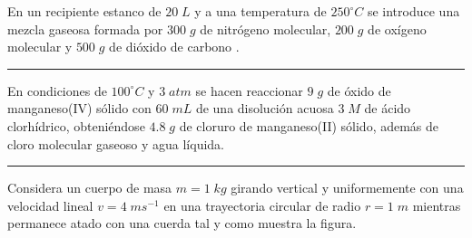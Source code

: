 \documentclass[a4paper,addpoints, 12pt]{exam}
\newcommand{\halmos}{\vspace*{-6mm}
	
					\begin{flushright}
						\rule{1mm}{2.5mm} 
					\end{flushright}
					\vspace*{-4mm}
						
					  }
\renewcommand{\qed}{\halmos}
\begin{document}
\begin{questions}

\question En un recipiente estanco de $20\;L$ y a una temperatura de $250^\circ C$ se introduce una mezcla gaseosa formada por $300\;g$ de nitrógeno molecular, $200\;g$ de oxígeno molecular y $500\;g$ de dióxido de carbono .
		\qed

\question En condiciones de $100^\circ C$ y $3\;atm$  se hacen reaccionar $9\;g$ de óxido de manganeso{\small(IV)} sólido con $60\;mL$ de una disolución acuosa $3\;M$ de ácido clorhídrico, obteniéndose $4.8\;g$ de cloruro de manganeso{\small(II)} sólido,  además de cloro molecular gaseoso y agua líquida.
  	\qed



	\vspace{-3ex}
	
\begin{minipage}{.7\textwidth}
	
	\question Considera un cuerpo de masa $m=1\;kg$ girando vertical y uniformemente con una velocidad lineal $v=4\;ms^{-1}$ en una trayectoria circular de radio $r=1\;m$ mientras permanece atado con una cuerda tal y como muestra la figura. 
	\end{minipage}\hfill
	\begin{minipage}{.35\textwidth}
	\vspace*{3ex}
	

\end{minipage}
\end{questions}
\end{document}
